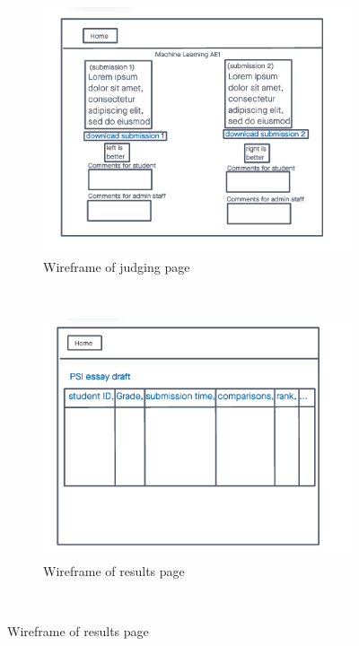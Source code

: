 \documentclass{l4proj}
\begin{document}
\begin{figure}[h]
    \centering
    \begin{subfigure}[b]{0.45\textwidth}
        \includegraphics[width=\textwidth]{images/w-judging.png}
        \caption{Wireframe of judging page}
        \label{fig:syn1}
    \end{subfigure}
    ~ %
    \begin{subfigure}[b]{0.45\textwidth}
        \includegraphics[width=\textwidth]{images/w-results.png}
        \caption{Wireframe of results page}
        \label{fig:syn2}
    \end{subfigure}
    ~ %
\end{figure}
\end{document}

